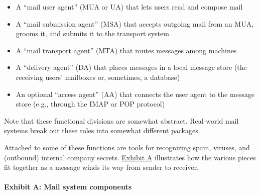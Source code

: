 \begin{itemize}
\tightlist
\item
  A
  ``\protect\hypertarget{part0026_split_001.htmlux5cux23_idIndexMarker2385}{}{}\protect\hypertarget{part0026_split_001.htmlux5cux23_idIndexMarker2386}{}{}\protect\hypertarget{part0026_split_001.htmlux5cux23_idIndexMarker2387}{}{}mail
  user agent'' (MUA or UA) that lets users read and compose mail
\item
  A
  ``\protect\hypertarget{part0026_split_001.htmlux5cux23_idIndexMarker2388}{}{}\protect\hypertarget{part0026_split_001.htmlux5cux23_idIndexMarker2389}{}{}mail
  submission agent'' (MSA) that accepts outgoing mail from an MUA,
  grooms it, and submits it to the transport system
\item
  A
  ``\protect\hypertarget{part0026_split_001.htmlux5cux23_idIndexMarker2390}{}{}\protect\hypertarget{part0026_split_001.htmlux5cux23_idIndexMarker2391}{}{}mail
  transport agent'' (MTA) that routes messages among machines
\item
  A
  ``\protect\hypertarget{part0026_split_001.htmlux5cux23_idIndexMarker2392}{}{}\protect\hypertarget{part0026_split_001.htmlux5cux23_idIndexMarker2393}{}{}delivery
  agent'' (DA) that places messages in a local message store (the
  receiving users' mailboxes or, sometimes, a database)
\item
  An optional
  ``\protect\hypertarget{part0026_split_001.htmlux5cux23_idIndexMarker2394}{}{}\protect\hypertarget{part0026_split_001.htmlux5cux23_idIndexMarker2395}{}{}access
  agent'' (AA) that connects the user agent to the message store (e.g.,
  through the IMAP or POP protocol)
\end{itemize}

Note that these functional divisions are somewhat abstract. Real-world
mail systems break out these roles into somewhat different packages.

Attached to some of these functions are tools for recognizing spam,
viruses, and (outbound) internal company secrets.
\protect\hyperlink{part0026_split_001.htmlux5cux23_idTextAnchor1003}{Exhibit
A} illustrates how the various pieces fit together as a message winds
its way from sender to
receiver.\protect\hypertarget{part0026_split_001.htmlux5cux23_idIndexMarker2396}{}{}

\paragraph[{Exhibit A: }Mail system components]{\texorpdfstring{{Exhibit
A:
}\protect\hypertarget{part0026_split_001.htmlux5cux23_idTextAnchor1003}{}{}Mail
system components}{Exhibit A: Mail system components}}

